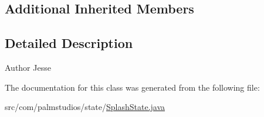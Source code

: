\subsection*{Additional Inherited Members}


\subsection{Detailed Description}
\begin{DoxyAuthor}{Author}
Jesse 
\end{DoxyAuthor}


The documentation for this class was generated from the following file\+:\begin{DoxyCompactItemize}
\item 
src/com/palmstudios/state/\hyperlink{_splash_state_8java}{Splash\+State.\+java}\end{DoxyCompactItemize}
